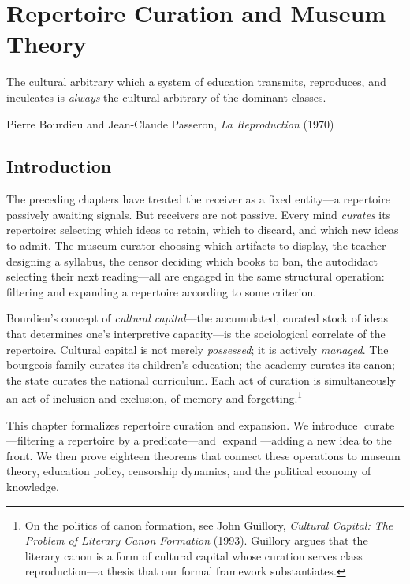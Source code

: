 
\chapter{Repertoire Curation and Museum Theory}
\label{ch:curation}

\epigraph{The cultural arbitrary which a system of education transmits,
reproduces, and inculcates is \emph{always} the cultural arbitrary of the
dominant classes.}{Pierre Bourdieu and Jean-Claude Passeron,
\textit{La Reproduction} (1970)}

\section{Introduction}

The preceding chapters have treated the receiver as a fixed entity---a
repertoire passively awaiting signals.  But receivers are not passive.
Every mind \emph{curates} its repertoire: selecting which ideas to retain,
which to discard, and which new ideas to admit.  The museum curator
choosing which artifacts to display, the teacher designing a syllabus, the
censor deciding which books to ban, the autodidact selecting their next
reading---all are engaged in the same structural operation: filtering and
expanding a repertoire according to some criterion.

Bourdieu's concept of \emph{cultural capital}---the accumulated, curated
stock of ideas that determines one's interpretive capacity---is the
sociological correlate of the repertoire.  Cultural capital is not merely
\emph{possessed}; it is actively \emph{managed}.  The bourgeois family
curates its children's education; the academy curates its canon; the state
curates the national curriculum.  Each act of curation is simultaneously
an act of inclusion and exclusion, of memory and forgetting.\footnote{On the
politics of canon formation, see John Guillory, \textit{Cultural Capital:
The Problem of Literary Canon Formation} (1993).  Guillory argues that the
literary canon is a form of cultural capital whose curation serves class
reproduction---a thesis that our formal framework substantiates.}

This chapter formalizes repertoire curation and expansion.  We introduce
$\operatorname{curate}$---filtering a repertoire by a predicate---and
$\operatorname{expand}$---adding a new idea to the front.  We then prove
eighteen theorems that connect these operations to museum theory, education
policy, censorship dynamics, and the political economy of knowledge.

